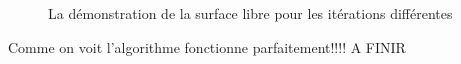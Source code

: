 \documentclass{article}
\begin{document}
\begin{figure}[H]
\begin{minipage}[h]{0.32\linewidth}
    \end{minipage}
    \caption{La démonstration de la surface libre pour les itérations différentes}
\end{figure}
    
Comme on voit l'algorithme fonctionne parfaitement!!!! A FINIR
\end{document}
